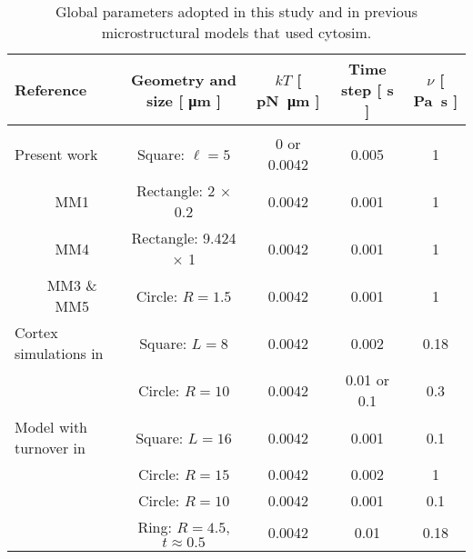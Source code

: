 \begin{sidewaystable}
	\begin{minipage}[c][\textheight][c]{\textwidth}
		\begin{center}\begin{tabular}{lccccc} \multicolumn{2}{l}{\textbf{Reference}}  &  Geometry and size [ \si{\micro\meter}\textbf{ ]} & $kT$ \textbf{[ }\si{\pico\newton \micro\meter}\textbf{ ]} & Time step [ \si{\second}\textbf{ ]} & $\nu$ \textbf{[ }\si{\pascal \second}\textbf{ ]} \\ \hline \\
				
				\multicolumn{2}{l}{Present work}  & Square: $\ell = 5$ & 0 or 0.0042 & 0.005 & 1  \\
				
				\multirow{3}{*}{\cite{Cortes2020}} & MM1 & Rectangle: 2 $\times$ 0.2 & 0.0042 & 0.001 & 1 \\
				
				& MM4 & Rectangle: 9.424 $\times$ 1 & 0.0042 & 0.001 & 1 \\
				
				& MM3 \& MM5 & Circle: $R = 1.5$ & 0.0042 & 0.001 & 1 \\
				
				\multicolumn{2}{l}{Cortex simulations in  \cite{Wollrab2019}} & Square: $L = 8$ & 0.0042 & 0.002 & 0.18 \\
				
				\multicolumn{2}{l}{ \cite{Bun2018}} & Circle: $R = 10$ & 0.0042 & 0.01 or 0.1 & 0.3  \\
				
				\multicolumn{2}{l}{Model with turnover in  \cite{Belmonte2017}} & Square: $L = 16$ & 0.0042 & 0.001 & 0.1 \\
				
				\multicolumn{2}{l}{ \cite{Descovich2017}} & Circle: $R = 15$ & 0.0042 & 0.002 & 1 \\
				
				\multicolumn{2}{l}{\cite{Ding2017}} & Circle: $R = 10$ & 0.0042 & 0.001 & 0.1 \\
				
				\multicolumn{2}{l}{\cite{Ennomani2016}} & Ring: $R = 4.5$, $t \approx 0.5 $ & 0.0042 & 0.01 & 0.18 \\
				
			\end{tabular}
		\end{center}
			\caption{Global parameters adopted in this study and in previous microstructural models that used cytosim.}
		\label{tab:GlobalParamTable}
	\end{minipage}
\end{sidewaystable}

